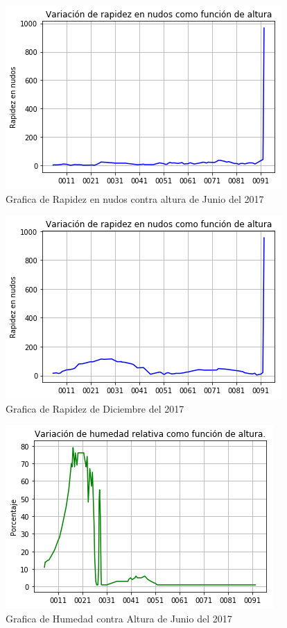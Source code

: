 \documentclass{article}
\begin{document}
\begin{figure}
\includegraphics[width=\linewidth]{RapidezJun.png}
\caption{Grafica de Rapidez en nudos contra altura de Junio del 2017}
\end{figure}

\begin{figure}
\includegraphics[width=\linewidth]{RapidezDic.png}
\caption{Grafica de Rapidez de Diciembre del 2017}
\end{figure}

\begin{figure}
\includegraphics[width=\linewidth]{HumedadJun.png}
\caption{Grafica de Humedad contra Altura de Junio del 2017}
\end{figure}
\end{document}
